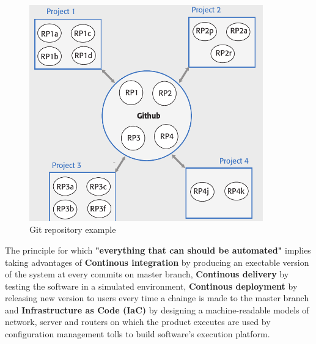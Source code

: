 \documentclass[10pt,a4paper]{report}
\begin{document}
\begin{figure}[h]
	\centering
	\includegraphics[width=0.9\textwidth]{image98}
	\caption{Git repository example}
	\label{image98}
\end{figure} 


The principle for which \textbf{"everything that can should be automated"} implies taking advantages of \textbf{Continous integration} by producing an exectable version of the system at every commits on master branch, \textbf{Continous delivery} by testing the software in a simulated environment, \textbf{Continous deployment} by releasing new version to users every time a chainge is made to the master branch and \textbf{Infrastructure as Code (IaC)} by designing a machine-readable models of network, server and routers on which the product executes are used by configuration management tolls to build software's execution platform. 
\end{document}

